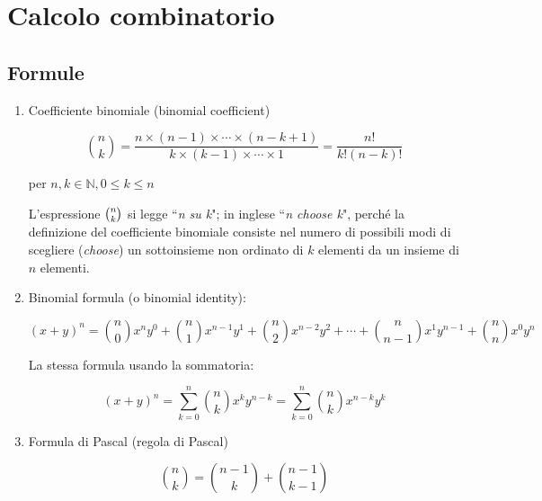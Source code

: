 \section{Calcolo combinatorio}\label{subsec:calcolo_combinatorio}

\subsection{Formule}
\setcounter{equation}{0}

\begin{enumerate}

\item 
Coefficiente binomiale (binomial coefficient)

\begin{equation}
\binom{n}{k} = \frac{
n\times (n-1)\times\cdots\times(n-k+1)
}{
k\times(k-1)\times\cdots\times1
}
=\frac{n!}{k!(n-k)!}
\end{equation}



per $n,k\in \mathbb{N} ,0\leq k\leq n$

L'espressione $\tbinom{n}{k}$ si legge ``\emph{n su k}"; in inglese ``\emph{n choose k}", perché la definizione del coefficiente binomiale consiste nel numero di possibili modi di scegliere (\emph{choose}) un sottoinsieme non ordinato di $k$ elementi da un insieme di $n$ elementi. 

\item
Binomial formula (o binomial identity):

\begin{equation*}
(x+y)^n=
\binom{n}{0}x^{n}y^0+
\binom{n}{1}x^{n-1}y^1+
\binom{n}{2}x^{n-2}y^2+\cdots+
\binom{n}{n-1}x^{1}y^{n-1}+
\binom{n}{n}x^{0}y^{n}
\end{equation*}

La stessa formula usando la sommatoria:

\begin{equation}
(x+y)^n=\sum_{k=0}^{n}{\binom{n}{k}x^{k}y^{n-k}}
=\sum_{k=0}^{n}{\binom{n}{k}x^{n-k}y^{k}}
\end{equation}


\item
Formula di Pascal (regola di Pascal)

\begin{equation}\label{formula_pascal}
{n \choose k}={n-1 \choose k}+{n-1 \choose k-1}
\end{equation}

\end{enumerate}

